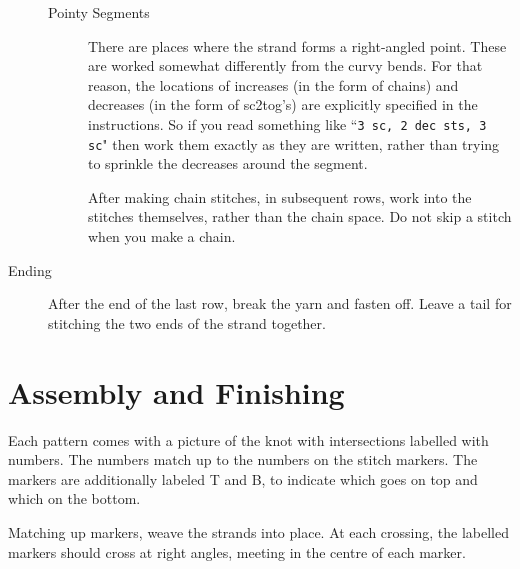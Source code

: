 \documentclass[openany]{book}
\begin{document}
\begin{description}
\begin{description}
 \item[Pointy Segments]
There are places where the strand forms a right-angled point. These are worked somewhat differently from the curvy bends. For that reason, the locations of increases (in the form of chains) and decreases (in the form of sc2tog's) are explicitly specified in the instructions. So if you read something like ``\texttt{3 sc, 2 dec sts, 3 sc}" then work them exactly as they are written, rather than trying to sprinkle the decreases around the segment. 

After making chain stitches, in subsequent rows, work into the stitches themselves, rather than the chain space. Do not skip a stitch when you make a chain.
\end{description}

\item[Ending] After the end of the last row, break the yarn and fasten off. Leave a tail for stitching the two ends of the strand together.


%
%
\end{description}

\section{Assembly and Finishing}\label{sec:assembly}

Each pattern comes with a picture of the knot with intersections labelled with numbers. The numbers match up to the numbers on the stitch markers. The markers are additionally labeled T and B, to indicate which goes on top and which on the bottom.

Matching up markers, weave the strands into place. At each crossing, the labelled markers should cross at right angles, meeting in the centre of each marker.
\end{document}
